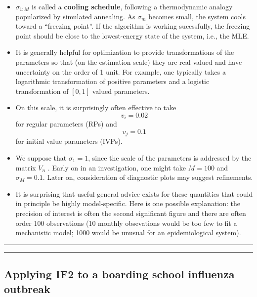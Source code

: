 \documentclass[]{article}
\begin{document}
\begin{itemize}
\[\begin{array}{ll}
  0 & \mbox{if $n\neq q$} \end{array}\right.\]
\item
  \(\sigma_{1:M}\) is called a \textbf{cooling schedule}, following a
  thermodynamic analogy popularized by
  \href{https://en.wikipedia.org/wiki/Simulated_annealing}{simulated
  annealing}. As \(\sigma_m\) becomes small, the system cools toward a
  ``freezing point''. If the algorithm is working sucessfully, the
  freezing point should be close to the lowest-energy state of the
  system, i.e., the MLE.
\item
  It is generally helpful for optimization to provide transformations of
  the parameters so that (on the estimation scale) they are real-valued
  and have uncertainty on the order of 1 unit. For example, one
  typically takes a logarithmic transformation of positive parameters
  and a logistic transformation of \([0,1]\) valued parameters.
\item
  On this scale, it is surprisingly often effective to take
  \[ v_i = 0.02\] for regular parameters (RPs) and \[ v_j = 0.1\] for
  initial value parameters (IVPs).
\item
  We suppose that \(\sigma_1=1\), since the scale of the parameters is
  addressed by the matrix \(V_n\) . Early on in an investigation, one
  might take \(M=100\) and \(\sigma_M=0.1\). Later on, consideration of
  diagnostic plots may suggest refinements.
\item
  It is surprising that useful general advice exists for these
  quantities that could in principle be highly model-specific. Here is
  one possible explanation: the precision of interest is often the
  second significant figure and there are often order 100 observations
  (10 monthly obsevations would be too few to fit a mechanistic model;
  1000 would be unusual for an epidemiological system).
\end{itemize}

\begin{center}\rule{0.5\linewidth}{\linethickness}\end{center}

\begin{center}\rule{0.5\linewidth}{\linethickness}\end{center}

\subsection{Applying IF2 to a boarding school influenza
outbreak}\label{applying-if2-to-a-boarding-school-influenza-outbreak}
\end{document}
